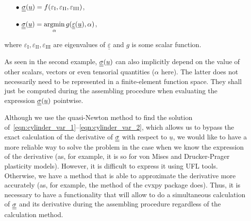 \documentclass[12pt]{article}
\begin{document}
\begin{itemize}
    \item[$\bullet$] $\underline{\underline{\sigma}}(\underline{u}) = f(\varepsilon_\text{I}, \varepsilon_\text{II}, \varepsilon_\text{III})$,
    \item[$\bullet$] $\underline{\underline{\sigma}}(\underline{u}) = \underset{\alpha}{\operatorname{argmin}}\, g(\underline{\underline{\varepsilon}}(\underline{u}),  \alpha)$,
\end{itemize}
where $\varepsilon_\text{I}, \varepsilon_\text{II}, \varepsilon_\text{III}$ are eigenvalues of $\underline{\underline{\varepsilon}}$ and $g$ is some scalar function.




As seen in the second example, $\underline{\underline{\sigma}}(\underline{u})$ can also implicitly depend on the value of other scalars, vectors or even tensorial quantities ($\alpha$ here). The latter does not necessarily need to be represented in a finite-element function space. They shall just be computed during the assembling procedure when evaluating the expression $\underline{\underline{\sigma}}(\underline{u})$ pointwise.

Although we use the quasi-Newton method to find the solution of~\eqref{eqn:cylinder_var_1}--\eqref{eqn:cylinder_var_2}, which allows us to bypass the exact calculation of the derivative of $\underline{\underline{\sigma}}$ with respect to $\underline{u}$, we would like to have a more reliable way to solve the problem in the case when we know the expression of the derivative (as, for example, it is so for von Mises and Drucker-Prager plasticity models). However, it is difficult to express it using UFL tools. Otherwise, we have a method that is able to approximate the derivative more accurately (as, for example, the  method of the cvxpy package does). Thus, it is necessary to have a functionality that will allow to do a simultaneous calculation of $\underline{\underline{\sigma}}$ and its derivative during the assembling procedure regardless of the calculation method.
\end{document}
